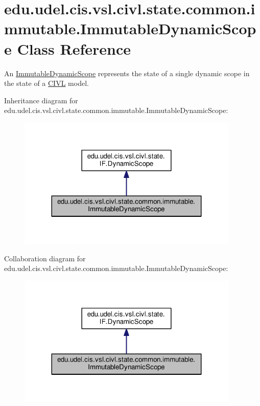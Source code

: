 \hypertarget{classedu_1_1udel_1_1cis_1_1vsl_1_1civl_1_1state_1_1common_1_1immutable_1_1ImmutableDynamicScope}{}\section{edu.\+udel.\+cis.\+vsl.\+civl.\+state.\+common.\+immutable.\+Immutable\+Dynamic\+Scope Class Reference}
\label{classedu_1_1udel_1_1cis_1_1vsl_1_1civl_1_1state_1_1common_1_1immutable_1_1ImmutableDynamicScope}


An \hyperlink{classedu_1_1udel_1_1cis_1_1vsl_1_1civl_1_1state_1_1common_1_1immutable_1_1ImmutableDynamicScope}{Immutable\+Dynamic\+Scope} represents the state of a single dynamic scope in the state of a \hyperlink{classedu_1_1udel_1_1cis_1_1vsl_1_1civl_1_1CIVL}{C\+I\+V\+L} model.  




Inheritance diagram for edu.\+udel.\+cis.\+vsl.\+civl.\+state.\+common.\+immutable.\+Immutable\+Dynamic\+Scope\+:
\nopagebreak
\begin{figure}[H]
\begin{center}
\leavevmode
\includegraphics[width=299pt]{classedu_1_1udel_1_1cis_1_1vsl_1_1civl_1_1state_1_1common_1_1immutable_1_1ImmutableDynamicScope__inherit__graph}
\end{center}
\end{figure}


Collaboration diagram for edu.\+udel.\+cis.\+vsl.\+civl.\+state.\+common.\+immutable.\+Immutable\+Dynamic\+Scope\+:
\nopagebreak
\begin{figure}[H]
\begin{center}
\leavevmode
\includegraphics[width=299pt]{classedu_1_1udel_1_1cis_1_1vsl_1_1civl_1_1state_1_1common_1_1immutable_1_1ImmutableDynamicScope__coll__graph}
\end{center}
\end{figure}
